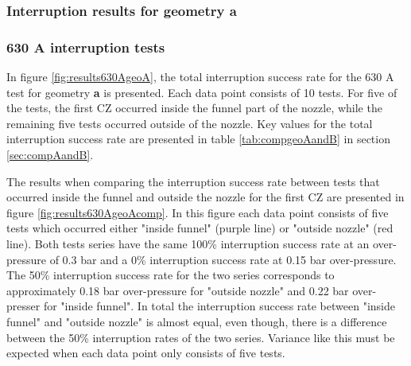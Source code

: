 \documentclass[10pt,b5paper,twoside]{article}
\begin{document}
\subsubsection{Interruption results for geometry \textbf{a}}

\subsubsection*{630 A interruption tests}

In figure \ref{fig:results630AgeoA}, the total interruption success rate for the 630 A test for geometry \textbf{a} is presented. Each data point consists of 10 tests. For five of the tests, the first CZ occurred inside the funnel part of the nozzle, while the remaining five tests occurred outside of the nozzle. Key values for the total interruption success rate are presented in table \ref{tab:compgeoAandB} in section \ref{sec:compAandB}.


The results when comparing the interruption success rate between tests that occurred inside the funnel and outside the nozzle for the first CZ are presented in figure \ref{fig:results630AgeoAcomp}. In this figure each data point consists of five tests which occurred either "inside funnel" (purple line) or "outside nozzle" (red line). Both tests series have the same 100\% interruption success rate at an over-pressure of 0.3 bar and a 0\% interruption success rate at 0.15 bar over-pressure. The 50\% interruption success rate for the two series corresponds to approximately 0.18 bar over-pressure for "outside nozzle" and 0.22 bar over-presser for "inside funnel". In total the interruption success rate between "inside funnel" and "outside nozzle" is almost equal, even though, there is a difference between the 50\% interruption rates of the two series. Variance like this must be expected when each data point only consists of five tests.
\end{document}
